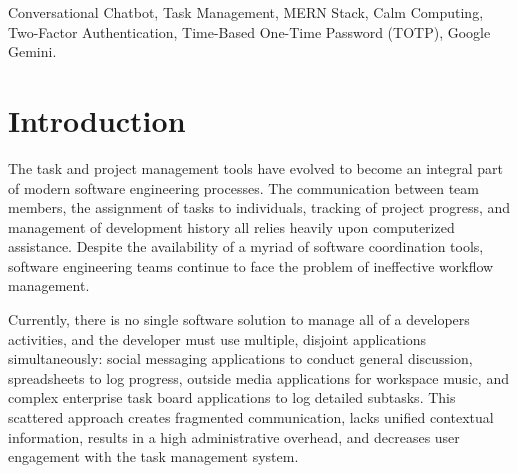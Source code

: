 \documentclass[conference]{IEEEtran}
\begin{document}
\begin{abstract}
The rapid rise of digital tools has altered the way software development teams coordinate and manage projects. However, the team is still forced to coordinate project-related efforts across disconnected toolkits including conventional lists, spreadsheet documents and independent chat rooms that often result in notification over-load, cognitive dissonance from task state-changes, no global context of a task and neglect of the system used to manage project tasks. This IntelliTasker proposed to offer a centralized web application to manage tasks with the capabilities for dynamic visualization, dynamic sub-task decomposition, authentication and real-time team-collaboration within a single workspace. Users will be able to organize and visualize tasks via custom board and list arrangements, automatically create dynamic action plans via generative AI, secure sensitive metadata via clock-drift resilient two-factor authentication and enhance their work productivity via an exclusive calm zone with integrated focus audio features. The IntelliTasker is developed using React, Tailwind CSS, Express, Node.js and MongoDB Atlas with a well-designed, modular and scalable structure, leading to high performance, low maintenance and excellent extensibility for future enhancements. The current solution integrates visual coordination, AI assistance, well-being features for developers and data security in a single web application.
\end{abstract}

\begin{IEEEkeywords}
Conversational Chatbot, Task Management, MERN Stack, Calm Computing, Two-Factor Authentication, Time-Based One-Time Password (TOTP), Google Gemini.
\end{IEEEkeywords}

\section{Introduction}
The task and project management tools have evolved to become an integral part of modern software engineering processes. The communication between team members, the assignment of tasks to individuals, tracking of project progress, and management of development history all relies heavily upon computerized assistance. Despite the availability of a myriad of software coordination tools, software engineering teams continue to face the problem of ineffective workflow management.

Currently, there is no single software solution to manage all of a developers activities, and the developer must use multiple, disjoint applications simultaneously: social messaging applications to conduct general discussion, spreadsheets to log progress, outside media applications for workspace music, and complex enterprise task board applications to log detailed subtasks. This scattered approach creates fragmented communication, lacks unified contextual information, results in a high administrative overhead, and decreases user engagement with the task management system.
\end{document}
